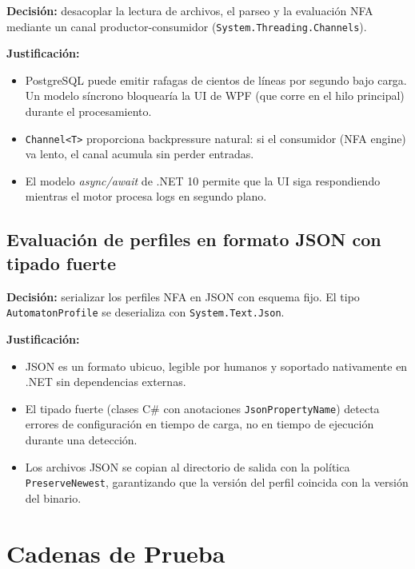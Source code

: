 \documentclass[12pt, a4paper]{report}
\theoremstyle{definition}
\theoremstyle{remark}
\begin{document}
\textbf{Decisión:} desacoplar la lectura de archivos, el parseo y la evaluación
NFA mediante un canal productor-consumidor (\texttt{System.Threading.Channels}).

\textbf{Justificación:}
\begin{itemize}
  \item PostgreSQL puede emitir rafagas de cientos de líneas por segundo bajo
    carga. Un modelo síncrono bloquearía la UI de WPF (que corre en el hilo
    principal) durante el procesamiento.
  \item \texttt{Channel\textless T\textgreater} proporciona backpressure natural: si el consumidor
    (NFA engine) va lento, el canal acumula sin perder entradas.
  \item El modelo \emph{async/await} de .NET 10 permite que la UI siga
    respondiendo mientras el motor procesa logs en segundo plano.
\end{itemize}

\section{Evaluación de perfiles en formato JSON con tipado fuerte}

\textbf{Decisión:} serializar los perfiles NFA en JSON con esquema fijo.
El tipo \texttt{AutomatonProfile} se deserializa con \texttt{System.Text.Json}.

\textbf{Justificación:}
\begin{itemize}
  \item JSON es un formato ubicuo, legible por humanos y soportado nativamente
    en .NET sin dependencias externas.
  \item El tipado fuerte (clases C\# con anotaciones \texttt{JsonPropertyName})
    detecta errores de configuración en tiempo de carga, no en tiempo de
    ejecución durante una detección.
  \item Los archivos JSON se copian al directorio de salida con la política
    \texttt{PreserveNewest}, garantizando que la versión del perfil coincida
    con la versión del binario.
\end{itemize}

\chapter{Cadenas de Prueba}
\end{document}
